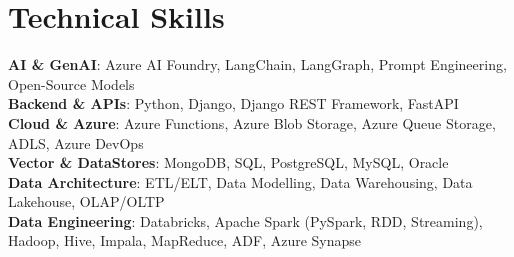 \documentclass[letterpaper,11pt]{article}
\begin{document}




\section{Technical Skills}

\begin{itemize}[leftmargin=0.15in, label={}]
    \small{\item{
     \textbf{AI \& GenAI}{:\hspace{1.50cm} Azure AI Foundry, LangChain, LangGraph, Prompt Engineering, Open-Source Models} \\
     \textbf{Backend \& APIs}{:\hspace{0.75 cm} Python, Django, Django REST Framework, FastAPI} \\
     \textbf{Cloud \& Azure}{:\hspace{1.0 cm} Azure Functions, Azure Blob Storage, Azure Queue Storage, ADLS, Azure DevOps} \\
     \textbf{Vector \& DataStores}{:\hspace{0.0cm} MongoDB, SQL, PostgreSQL, MySQL, Oracle} \\
     \textbf{Data Architecture}{:\hspace{0.48 cm} ETL/ELT, Data Modelling, Data Warehousing, Data Lakehouse, OLAP/OLTP} \\
     \textbf{Data Engineering}{:\hspace{0.6 cm} Databricks, Apache Spark (PySpark, RDD, Streaming), Hadoop, Hive, Impala, MapReduce, ADF, Azure Synapse} \\
    }}
\end{itemize}




\end{document}
